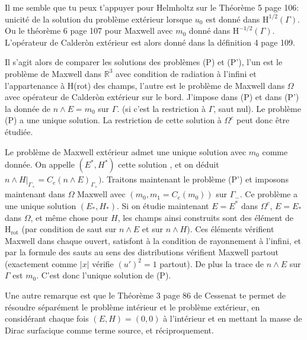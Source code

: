 \documentclass[12pt,%
    twoside,%
    a4paper,%
    openright, %
    ]{book}
\numberwithin{equation}{section} %
\newcommand{\RR}{\mathbb R}
\newcommand{\Sobup}[1][{}]{\mathrm{H}^\mathrm{#1}}
\newcommand{\Sobdw}[1][{}]{\mathrm{H}_\mathrm{#1}}
\newcommand{\Sobolev}[1][{}]{\Sobup[#1]}
\newcommand{\Hrot}{\Sobdw[rot]}
\newcounter{REM}
\newenvironment{REM}[1][\theREM]
    {%
        \stepcounter{REM}
        \hypertarget{REM#1}{}%
        \pdfbookmark[0]{REM \theREM}{REM#1}
        \begin{tcolorbox}[%
                title={Remarque \theREM},%
                colback=red!30!white,%
                colframe=red!75!black,%
            ]
    }
    {
        \end{tcolorbox}%
    }%
\begin{document}
  \begin{REM}
    
    Il me semble que tu peux t'appuyer pour Helmholtz sur le Théorème 5 page 106: unicité de la solution du problème extérieur lorsque \(u_0\) est donné dans \(\Sobolev[1/2](\Gamma)\).
    Ou le théorème 6 page 107 pour Maxwell avec \(m_0\) donné dans \(\Sobolev[-1/2](\Gamma)\).
    L'opérateur de Calderòn extérieur est alors donné dans la définition 4 page 109.
    
    Il s'agit alors de comparer les solutions des problèmes (P) et (P'), l'un est le problème de Maxwell dans \(\RR^3\) avec condition de radiation à l'infini et l'appartenance à H(rot) des champs, l'autre est le problème de Maxwell dans \(\Omega\) avec opérateur de Calderòn extérieur sur le bord.
    J'impose dans (P) et dans (P') la donnée de \(n\wedge E=m_0\) sur \(\Gamma\). (si c'est la restriction à \(\Gamma\), saut nul).
    Le problème (P)  a une unique solution.
    La restriction de cette solution à \(\Omega^c\) peut donc être étudiée.
    
    
    Le problème de Maxwell extérieur admet une unique solution avec \(m_0\) comme donnée. On appelle \((E^*, H^*)\) cette solution , et on déduit \(n\wedge H\vert_{\Gamma_+}= C_e(n\wedge E)_{\Gamma_+})\).
    Traitons maintenant le problème (P') et imposons maintenant dans \(\Omega\) Maxwell avec \((m_0, m_1=C_e(m_0))\) sur \(\Gamma_-\).
    Ce problème a une unique solution \((E_*, H_*)\).
    Si on étudie maintenant \(E=E^*\) dans \(\Omega^c\), \(E=E_*\) dans \(\Omega\), et même chose pour \(H\), les champs ainsi construits sont des élément de \(\Hrot\) (par condition de saut sur \(n\wedge E\) et sur \(n\wedge H\)).
    Ces éléments vérifient Maxwell dans chaque ouvert, satisfont à la condition de rayonnement à l'infini, et par la formule des sauts au sens des distributions vérifient Maxwell partout (exactement comme \(\vert x\vert\) vérifie \((u')^2=1\) partout).
    De plus la trace de \(n\wedge E\) sur \(\Gamma\) est \(m_0\). C'est donc l'unique solution de (P).  
  \end{REM}
  \begin{REM}
    Une autre remarque est que le Théorème 3 page 86 de Cessenat te permet de résoudre séparément le problème intérieur et le problème extérieur, en considérant chaque fois \((E,H)=(0,0)\) à l'intérieur et en mettant la masse de Dirac surfacique comme terme source, et réciproquement.
  \end{REM}
\end{document}
